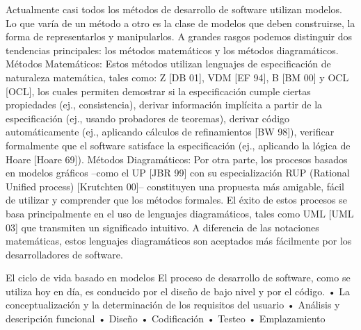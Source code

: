 \begin{enumerate}
Actualmente casi todos los métodos de desarrollo de software utilizan modelos. Lo que varía de un método a otro es la clase de modelos que deben construirse, la forma de representarlos y manipularlos. A grandes rasgos podemos distinguir dos tendencias principales: los métodos matemáticos y los métodos diagramáticos.
Métodos Matemáticos:
Estos métodos utilizan lenguajes de especificación de naturaleza matemática, tales como: Z [DB 01], VDM [EF 94], B [BM 00] y OCL [OCL], los cuales permiten demostrar si la especificación cumple ciertas propiedades (ej., consistencia), derivar información implícita a partir de la especificación (ej., usando probadores de teoremas), derivar código automáticamente (ej., aplicando cálculos de refinamientos [BW 98]), verificar formalmente que el software satisface la especificación (ej., aplicando la lógica de Hoare [Hoare 69]).
Métodos Diagramáticos:
Por otra parte, los procesos basados en modelos gráficos –como el UP [JBR 99] con su especialización RUP (Rational Unified process) [Krutchten 00]– constituyen una propuesta más amigable, fácil de utilizar y comprender que los métodos formales. El éxito de estos procesos se basa principalmente en el uso de lenguajes diagramáticos, tales como UML [UML 03] que transmiten un significado intuitivo. A diferencia de las notaciones matemáticas, estos lenguajes diagramáticos son aceptados más fácilmente por los desarrolladores de software.

El ciclo de vida basado en modelos
El proceso de desarrollo de software, como se utiliza hoy en día, es conducido por el diseño de bajo nivel y por el código.
•	La conceptualización y la determinación de los requisitos del usuario 
•	Análisis y descripción funcional 
•	Diseño 
•	Codificación
•	Testeo 
•	Emplazamiento
 

\end{enumerate}
